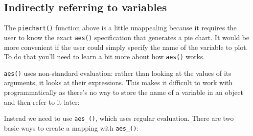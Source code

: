 \subsection{Indirectly referring to variables}

The \texttt{piechart()} function above is a little unappealing because
it requires the user to know the exact \texttt{aes()} specification that
generates a pie chart. It would be more convenient if the user could
simply specify the name of the variable to plot. To do that you'll need
to learn a bit more about how \texttt{aes()} works.

\texttt{aes()} uses non-standard evaluation: rather than looking at the
values of its arguments, it looks at their expressions. This makes it
difficult to work with programmatically as there's no way to store the
name of a variable in an object and then refer to it later:

\begin{Shaded}
\begin{Highlighting}[]
\end{Highlighting}
\end{Shaded}

Instead we need to use \texttt{aes\_()}, which uses regular evaluation.
There are two basic ways to create a mapping with \texttt{aes\_()}:


